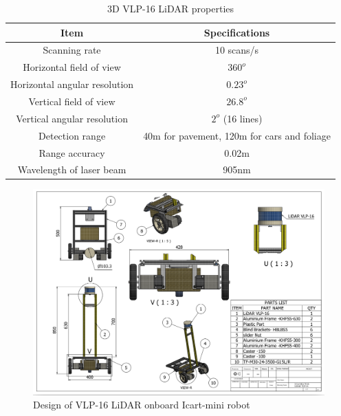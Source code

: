\begin{table}[h!]
    \centering
    \begin{tabular}{||c|c||}
        \hline
        \rowcolor{lightgray}
        \textbf{Item}                 & \textbf{Specifications}                     \\ [0.5ex]
        \hline\hline
        Scanning rate                 & 10 scans/s                                  \\ \hline
        Horizontal field of view      & $360^o$                                     \\ \hline
        Horizontal angular resolution & $0.23^o$                                    \\ \hline
        Vertical field of view        & $26.8^o$                                    \\ \hline
        Vertical angular resolution   & $2^o$ (16 lines)                            \\ \hline
        Detection range               & 40m for pavement, 120m for cars and foliage \\ \hline
        Range accuracy                & 0.02m                                       \\ \hline
        Wavelength of laser beam      & 905nm                                       \\ [0.5ex]
        \hline
    \end{tabular}
    \caption{3D VLP-16 LiDAR properties \cite{vlp16}}
    \label{Chap4:Table1}
\end{table}


\begin{figure}[!htb]
    \centering
    \includegraphics[width=1.0\linewidth]{figures/chap4_fig/Platform/Icart_mini_withLidar_drawing.png}
    \caption{Design of VLP-16 LiDAR onboard Icart-mini robot}
    \label{chap4:fig2}
\end{figure}



